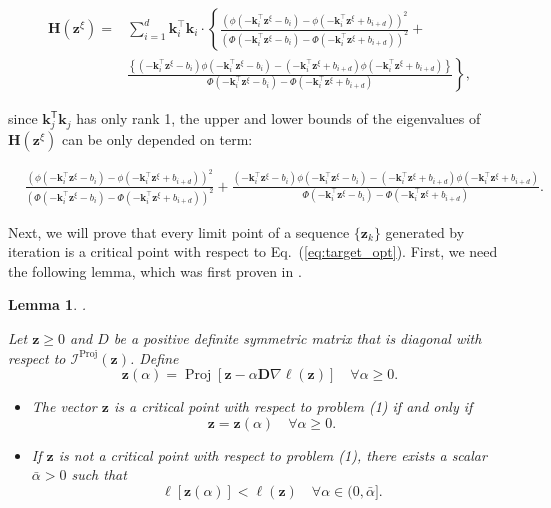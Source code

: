 \documentclass{article}
\theoremstyle{plain}
\newtheorem{lemma}[theorem]{Lemma}
\theoremstyle{definition}
\def \H {\mathbf{H}}
\def \sI {\mathcal{I}}
\def \k {\mathbf{k}}
\def \H {\mathbf{H}}
\def \H {\mathbf{H}}
\def \D {\mathbf{D}}
\def \z {\mathbf{z}}
\begin{document}
\[
\begin{aligned}
\mathbf{H}\left(\mathbf{z}^{\xi}\right) =&\sum_{i=1}^d \mathbf{k}_i^{\top} \mathbf{k}_i \cdot\left\{\frac{\left(\phi\left(-\mathbf{k}_i^{\top} \mathbf{z}^{\xi}-b_i\right)-\phi\left(-\mathbf{k}_i^{\top} \mathbf{z}^{\xi}+b_{i+d}\right)\right)^2}{\left(\Phi\left(-\mathbf{k}_i^{\top} \mathbf{z}^{\xi}-b_i\right)-\Phi\left(-\mathbf{k}_i^{\top} \mathbf{z}^{\xi}+b_{i+d}\right)\right)^2}+\right. \\
& \left.\frac{\left\{\left(-\mathbf{k}_i^{\top} \mathbf{z}^{\xi}-b_i\right) \phi\left(-\mathbf{k}_i^{\top} \mathbf{z}^{\xi}-b_i\right)-\left(-\mathbf{k}_i^{\top} \mathbf{z}^{\xi}+b_{i+d}\right) \phi\left(-\mathbf{k}_i^{\top} \mathbf{z}^{\xi}+b_{i+d}\right)\right\}}{\Phi\left(-\mathbf{k}_i^{\top} \mathbf{z}^{\xi}-b_i\right)-\Phi\left(-\mathbf{k}_i^{\top} \mathbf{z}^{\xi}+b_{i+d}\right)}\right\}, 
\end{aligned}
\]

since \(\k_j^\mathsf{T}\k_j\) has only rank 1, the upper and lower bounds of the eigenvalues of \(\H\left(\z^\xi\right)\) can be only depended on term: 

\[
\begin{aligned}
& \frac{\left(\phi\left(-\mathbf{k}_i^{\top} \mathbf{z}^{\xi}-b_i\right)-\phi\left(-\mathbf{k}_i^{\top} \mathbf{z}^{\xi}+b_{i+d}\right)\right)^2}{\left(\Phi\left(-\mathbf{k}_i^{\top} \mathbf{z}^{\xi}-b_i\right)-\Phi\left(-\mathbf{k}_i^{\top} \mathbf{z}^{\xi}+b_{i+d}\right)\right)^2}+\frac{\left(-\mathbf{k}_i^{\top} \mathbf{z}^{\xi}-b_i\right) \phi\left(-\mathbf{k}_i^{\top} \mathbf{z}^{\xi}-b_i\right)-\left(-\mathbf{k}_i^{\top} \mathbf{z}^{\xi}+b_{i+d}\right) \phi\left(-\mathbf{k}_i^{\top} \mathbf{z}^{\xi}+b_{i+d}\right)}{\Phi\left(-\mathbf{k}_i^{\top} \mathbf{z}^{\xi}-b_i\right)-\Phi\left(-\mathbf{k}_i^{\top} \mathbf{z}^{\xi}+b_{i+d}\right)}.
\end{aligned}
\]

Next, we will prove that every limit point of a sequence \(\{\z_k \}\) generated by iteration is a critical point with respect to Eq.~(\ref{eq:target_opt}). First, we need the following lemma, which was first proven in \citep{bertsekas1982projected}.

\begin{lemma}\citep{bertsekas1982projected}.
    
    Let \(\z \geq 0\) and \(D\) be a positive definite symmetric matrix that is diagonal with respect to \(\sI^{\operatorname{Proj}}(\z)\). Define
\[
\z(\alpha)=\operatorname{Proj}[\z-\alpha \D \nabla \ell(\z)] \quad \forall \alpha \geq 0.
\]
\begin{itemize}
    \item[1] \label{lemmaD1.1} The vector \(\z\) is a critical point with respect to problem (1) if and only if
\[
\z=\z(\alpha) \quad \forall \alpha \geq 0.
\]
    \item[2] \label{lemmaD1.2} If \(\z\) is not a critical point with respect to problem (1), there exists a scalar \(\bar{\alpha}>0\) such that
\[
\ell[\z(\alpha)]<\ell(\z) \quad \forall \alpha \in (0, \bar{\alpha}].
\]
\end{itemize}

\end{lemma}
\end{document}
